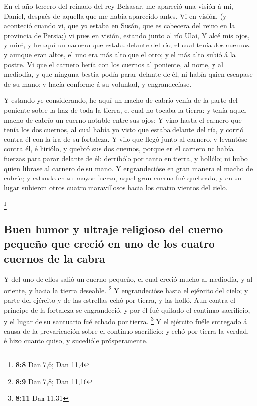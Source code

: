  En el año tercero del reinado del rey Belsasar, me
apareció una visión á mí, Daniel, después de aquella que me había
aparecido antes.  Vi en visión, (y aconteció cuando vi,
que yo estaba en Susán, que es cabecera del reino en la provincia de
Persia;) vi pues en visión, estando junto al río Ulai,  Y
alcé mis ojos, y miré, y he aquí un carnero que estaba delante del río,
el cual tenía dos cuernos: y aunque eran altos, el uno era más alto que
el otro; y el más alto subió á la postre.  Vi que el
carnero hería con los cuernos al poniente, al norte, y al mediodía, y
que ninguna bestia podía parar delante de él, ni había quien escapase de
su mano: y hacía conforme á su voluntad, y engrandecíase.

 Y estando yo considerando, he aquí un macho de cabrío
venía de la parte del poniente sobre la haz de toda la tierra, el cual
no tocaba la tierra: y tenía aquel macho de cabrío un cuerno notable
entre sus ojos:  Y vino hasta el carnero que tenía los dos
cuernos, al cual había yo visto que estaba delante del río, y corrió
contra él con la ira de su fortaleza.  Y vilo que llegó
junto al carnero, y levantóse contra él, é hiriólo, y quebró sus dos
cuernos, porque en el carnero no había fuerzas para parar delante de él:
derribólo por tanto en tierra, y hollólo; ni hubo quien librase al
carnero de su mano.  Y engrandecióse en gran manera el
macho de cabrío; y estando en su mayor fuerza, aquel gran cuerno fué
quebrado, y en su lugar subieron otros cuatro maravillosos hacia los
cuatro vientos del cielo.

\footnote{\textbf{8:8} Dan 7,6; Dan 11,4}

\hypertarget{buen-humor-y-ultraje-religioso-del-cuerno-pequeuxf1o-que-creciuxf3-en-uno-de-los-cuatro-cuernos-de-la-cabra}{%
\subsection{Buen humor y ultraje religioso del cuerno pequeño que creció
en uno de los cuatro cuernos de la
cabra}\label{buen-humor-y-ultraje-religioso-del-cuerno-pequeuxf1o-que-creciuxf3-en-uno-de-los-cuatro-cuernos-de-la-cabra}}

 Y del uno de ellos salió un cuerno pequeño, el cual
creció mucho al mediodía, y al oriente, y hacia la tierra deseable.
\footnote{\textbf{8:9} Dan 7,8; Dan 11,16}  Y
engrandecióse hasta el ejército del cielo; y parte del ejército y de las
estrellas echó por tierra, y las holló.  Aun contra el
príncipe de la fortaleza se engrandeció, y por él fué quitado el
continuo sacrificio, y el lugar de su santuario fué echado por tierra.
\footnote{\textbf{8:11} Dan 11,31}  Y el ejército fuéle
entregado á causa de la prevaricación sobre el continuo sacrificio: y
echó por tierra la verdad, é hizo cuanto quiso, y sucedióle
prósperamente.

